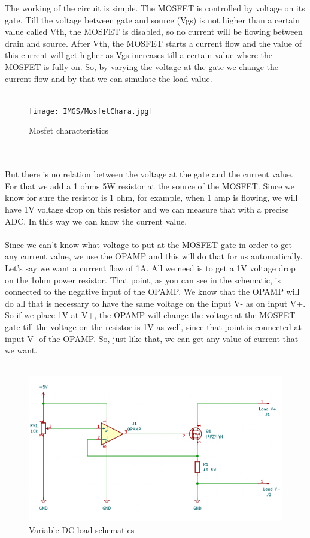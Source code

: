 The working of the circuit is simple. The MOSFET is controlled by voltage on its gate. Till the voltage between gate and source (Vgs) is not higher than a certain value called Vth, the MOSFET is disabled, so no current will be flowing between drain and source. After Vth, the MOSFET starts a current flow and the value of this current will get higher as Vgs increases till a certain value where the MOSFET is fully on. So, by varying the voltage at the gate we change the current flow and by that we can simulate the load value. 
\\ \\
\begin{figure}[h]
	\centering
	\texttt{[image: IMGS/MosfetChara.jpg]}
	\caption{Mosfet characteristics}
	\label{fig:arch}
\end{figure} 
\\ \\	
But there is no relation between the voltage at the gate and the current value. For that we add a 1 ohms 5W resistor at the source of the MOSFET. Since we know for sure the resistor is 1 ohm, for example, when 1 amp is flowing, we will have 1V voltage drop on this resistor and we can measure that with a precise ADC. In this way we can know the current value.
\\ \\
Since we can't know what voltage to put at the MOSFET gate in order to get any current value, we use the OPAMP and this will do that for us automatically. Let's say we want a current flow of 1A. All we need is to get a 1V voltage drop on the 1ohm power resistor. That point, as you can see in the schematic, is connected to the negative input of the OPAMP. We know that the OPAMP will do all that is necessary to have the same voltage on the input V- as on input V+. So if we place 1V at V+, the OPAMP will change the voltage at the MOSFET gate till the voltage on the resistor is 1V as well, since that point is connected at input V- of the OPAMP. So, just like that, we can get any value of current that we want.
\\ \\
\begin{figure}[h]
	\centering
	\includegraphics[width=\columnwidth]{IMGS/LoadSchematic.jpg}
	\caption{Variable DC load schematics}
	\label{fig:arch}
\end{figure} 
\\ \\	

